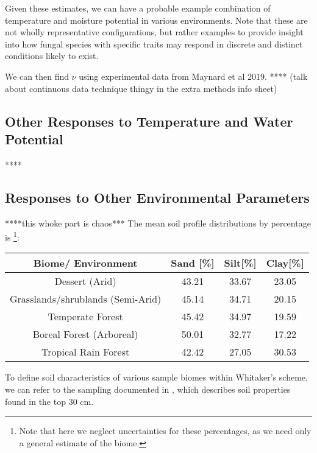 \documentclass{article}
\begin{document}
Given these estimates, we can have a probable example combination of temperature and moisture potential in various environments. Note that these are not wholly representative configurations, but rather examples to provide insight into how fungal species with specific traits may respond in discrete and distinct conditions likely to exist. 

We can then find $\nu$ using experimental data from Maynard et al 2019. **** (talk about continuous data technique thingy in the extra methods info sheet)

\subsection{Other Responses to Temperature and Water Potential}

****

\subsection{Responses to Other Environmental Parameters}
****this whoke part is chaos***
The mean soil profile distributions by percentage is \cite{Zhao2019} \footnote{Note that here we neglect uncertainties for these percentages, as we need only a general estimate of the biome.}: 
\begin{center}
 \begin{tabular}{|c c c c|} 
 \hline
 Biome/ Environment & Sand [\%] & Silt[\%] & Clay[\%] \\ [0.5ex] 
 \hline\hline
 Dessert (Arid) & 43.21 & 33.67 & 23.05 \\ 
 \hline
 Grasslands/shrublands (Semi-Arid) & 45.14 & 34.71 & 20.15 \\
 \hline
 Temperate Forest & 45.42 & 34.97 & 19.59 \\
 \hline
 Boreal Forest (Arboreal) & 50.01 & 32.77 & 17.22 \\
 \hline
 Tropical Rain Forest & 42.42 & 27.05 & 30.53 \\ [1ex] 
 \hline
\end{tabular}
\end{center}


To define soil characteristics of various sample biomes within Whitaker's scheme, we can refer to the sampling documented in {}, which describes soil properties found in the top 30 cm.
\end{document}
